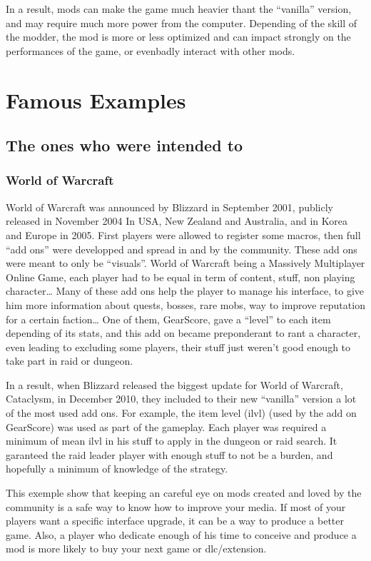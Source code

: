 \documentclass[a4paper,11pt]{article}
\begin{document}
In a result, mods can make the game much heavier thant the “vanilla” version, and may require much more power from the computer. Depending of the skill of the modder, the mod is more or less optimized and can impact strongly on the performances of the game, or evenbadly interact with other mods.

\section{Famous Examples}

\subsection{The ones who were intended to}

\subsubsection{World of Warcraft}

World of Warcraft was announced by Blizzard in September 2001, publicly released in November 2004 In USA, New Zealand and Australia, and in Korea and Europe in 2005. First players were allowed to register some macros, then full “add ons” were developped and spread in and by the community. These add ons were meant to only be “visuals”. World of Warcraft being a Massively Multiplayer Online Game, each player had to be equal in term of content, stuff, non playing character…
Many of these add ons help the player to manage his interface, to give him more information about quests, bosses, rare mobs, way to improve reputation for a certain faction… One of them, GearScore, gave a “level” to each item depending of its stats, and this add on became preponderant to rant a character, even leading to excluding some players, their stuff just weren’t good enough to take part in raid or dungeon.

In a result, when Blizzard released the biggest update for World of Warcraft, Cataclysm, in   December 2010, they included to their new “vanilla” version a lot of the most used add ons. For example, the item level (ilvl)  (used by the add on GearScore) was used as part of the gameplay. Each player was required a minimum of mean ilvl in his stuff to apply in the dungeon or raid search. It garanteed the raid leader player with enough stuff to not be a burden, and hopefully a minimum of knowledge of the strategy.

This exemple show that keeping an careful eye on mods created and loved by the community is a safe way to know how to improve your media. If most of your players want a specific interface upgrade, it can be a way to produce a better game. Also, a player who dedicate enough of his time to conceive and produce a mod is more likely to buy your next game or dlc/extension.
\end{document}
